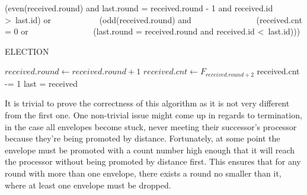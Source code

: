 \documentclass{article}
\begin{document}
\begin{algorithmic}
        \State \Return (even(received.round) and last.round = received.round - 1 and received.id \textgreater \ last.id) or
        \State \ \ \ \ \ \ \ \ \ \ \ (odd(received.round) and 
        \State \ \ \ \ \ \ \ \ \ \ \ \ \ \ \  (received.cnt = 0 or 
        \State \ \ \ \ \ \ \ \ \ \ \ \ \ \ \  (last.round = received.round and received.id \textless \ last.id)))
    \EndFunction

\begin{algorithm}[H]
\caption{ELECTION}
\Repeat
            \State $received.round \gets received.round + 1$
            \State $received.cnt \gets F_{received.round+2}$
        \EndIf
        \State received.cnt -= 1
        \State last = received
        \State {}
    \EndIf
\Until {}

\end{algorithm}
\end{algorithmic}

It is trivial to prove the correctness of this algorithm as it is not very different from the first one. One non-trivial issue might come up in regards to termination, in the case all envelopes become stuck, never meeting their successor's processor because they're being promoted by distance. Fortunately, at some point the envelope must be promoted with a count number high enough that it will reach the processor without being promoted by distance first. This ensures that for any round with more than one envelope, there exists a round no smaller than it, where at least one envelope must be dropped.
\\
\end{document}

